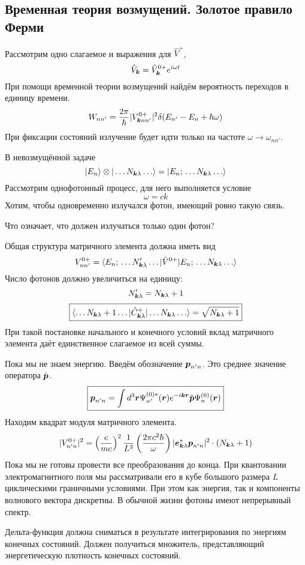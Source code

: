 \subsection{Временная теория возмущений. Золотое правило Ферми}
Рассмотрим одно слагаемое и выражения для $\hat V^+$,
$$
    \hat V_{\bf k} = \hat V_{\bf k}^{0+} e^{i\omega t}
$$
При помощи временной теории возмущений найдём вероятность переходов в единицу времени.
$$
    W_{nn'} = \dfrac{2 \pi}{\hbar} |V_{\bf k nn'}^{0+}|^2 \dta(E_{n'} - E_n + \hbar \omega)
$$
При фиксации состояний излучение будет идти только на частоте $\omega \to \omega_{nn'}$.

\def \Nkl {N_{\bf k \lambda}}

В невозмущённой задаче
$$
    \qu{E_n} \otimes \qu{\ldots \Nkl \ldots} = \qu{E_n; \, \ldots N_{\bf k \lambda} \ldots}
$$
Рассмотрим однофотонный процесс, для него выполняется условие
$$
    \omega = c k
$$
Хотим, чтобы одновременно излучался фотон, имеющий ровно такую связь.

Что означает, что должен излучаться только один фотон?

Общая структура матричного элемента должна иметь вид
$$
    V_{nn'}^{0+} = \qtri
    {E_n; \, \ldots \Nkl' \ldots}
    {\hat V^{0+}}
    {E_n; \, \ldots \Nkl \ldots}
$$
Число фотонов должно увеличиться на единицу:
$$
    \Nkl' = \Nkl +1
$$
$$
    \boxed{
        \qtri
        {\ldots N_{\bf k \lambda} + 1 \ldots}
        {\Ckl^+}
        {\ldots \Nkl \ldots} = \sqrt{\Nkl + 1}
    }
$$
При такой постановке начального и конечного условий вклад матричного элемента даёт единственное слагаемое из всей суммы.

Пока мы не знаем энергию. Введём обозначение $ \bf p_{n'n}$. Это среднее значение оператора $\hat{\bf p}$.
$$
\boxed{
    \bf p_{n'n} = \int d^3 \bf r \Psi_{n'}^{(0) \ast} (\bf r) e^{-i \bf k \bf r} \hat{\bf p} \Psi_n^{(0)} (\bf r)
}
$$
Находим квадрат модуля матричного элемента.
$$
    |V_{n'n}^{0+}|^2 = \left(\dfrac{e}{mc} \right)^2 \dfrac{1}{L^3} \left(
        \dfrac{2 \pi c^2 \hbar}{\omega}
    \right) |\bf e_{\bf k \lambda}^{\ast} \bf p_{n'n}|^2 \cdot (\Nkl + 1)
$$
Пока мы не готовы провести все преобразования до конца. При квантовании электромагнитного поля мы рассматривали его в кубе большого размера $L$  циклическими граничными условиями. При этом как энергия, так и компоненты волнового вектора дискретны. В обычной жизни фотоны имеют непрерывный спектр.

Дельта-функция должна сниматься в результате интегрирования по энергиям конечных состояний. Должен получиться множитель, представляющий энергетическую плотность конечных состояний.

